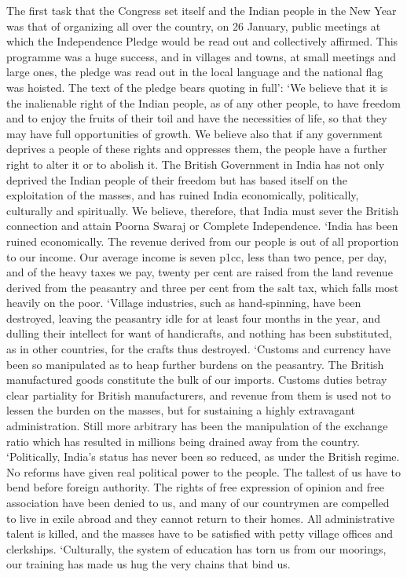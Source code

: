 \begin{multicols}{2}
The first task that the Congress set itself and the Indian people in the New Year was that of organizing all over the country, on 26 January, public meetings at which the Independence Pledge would be read out and collectively affirmed. This programme was a huge success, and in villages and towns, at small meetings and large ones, the pledge was read out in the local language and the national flag was hoisted. The text of the pledge bears quoting in full': `We believe that it is the inalienable right of the Indian people, as of any other people, to have freedom and to enjoy the fruits of their toil and have the necessities of life, so that they may have full opportunities of growth. We believe also that if any government deprives a people of these rights and oppresses them, the people have a further right to alter it or to abolish it. The British Government in India has not only deprived the Indian people of their freedom but has based itself on the exploitation of the masses, and has ruined India economically, politically, culturally and spiritually. We believe, therefore, that India must sever the British connection and attain Poorna Swaraj or Complete Independence. `India has been ruined economically. The revenue derived from our people is out of all proportion to our income. Our average income is seven p1cc, less than two pence, per day, and of the heavy taxes we pay, twenty per cent are raised from the land revenue derived from the peasantry and three per cent from the salt tax, which falls most heavily on the poor. `Village industries, such as hand-spinning, have been destroyed, leaving the peasantry idle for at least four months in the year, and dulling their intellect for want of handicrafts, and nothing has been substituted, as in other countries, for the crafts thus destroyed. `Customs and currency have been so manipulated as to heap further burdens on the peasantry. The British manufactured goods constitute the bulk of our imports. Customs duties betray clear partiality for British manufacturers, and revenue from them is used not to lessen the burden on the masses, but for sustaining a highly extravagant administration. Still more arbitrary has been the manipulation of the exchange ratio which has resulted in millions being drained away from the country. `Politically, India's status has never been so reduced, as under the British regime. No reforms have given real political power to the people. The tallest of us have to bend before foreign authority. The rights of free expression of opinion and free association have been denied to us, and many of our countrymen are compelled to live in exile abroad and they cannot return to their homes. All administrative talent is killed, and the masses have to be satisfied with petty village offices and clerkships. `Culturally, the system of education has torn us from our moorings, our training has made us hug the very chains that bind us. 


\end{multicols}
